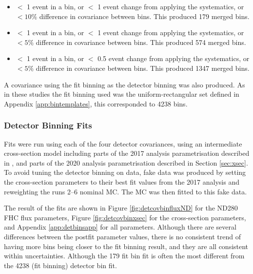 \begin{itemize}

\item $<$ 1 event in a bin, or $<$ 1 event change from applying the systematics, or $< 10\%$ difference in covariance between bins. This produced 179 merged bins.

\item $<$ 1 event in a bin, or $<$ 1 event change from applying the systematics, or $< 5\%$ difference in covariance between bins. This produced 574 merged bins.

\item $<$ 1 event in a bin, or $<$ 0.5 event change from applying the systematics, or $< 5\%$ difference in covariance between bins. This produced 1347 merged bins.

\end{itemize}

A covariance using the fit binning as the detector binning was also produced. As in these studies the fit binning used was the uniform-rectangular set defined in Appendix \ref{app:bintemplates}, this corresponded to 4238 bins.

\subsubsection{Detector Binning Fits}\label{sec:detbinfits}

Fits were run using each of the four detector covariances, using an intermediate cross-section model including parts of the 2017 analysis parametrisation described in \cite{tn315}, and parts of the 2020 analysis parametrisation described in Section \ref{sec:xsec}. To avoid tuning the detector binning on data, fake data was produced by setting the cross-section parameters to their best fit values from the 2017 analysis and reweighting the runs 2--6 nominal MC. The MC was then fitted to this fake data.

The result of the fits are shown in Figure \ref{fig:detcovbinfluxND} for the ND280 FHC flux parameters, Figure \ref{fig:detcovbinxsec} for the cross-section parameters, and Appendix \ref{app:detbinsapp} for all parameters. Although there are several differences between the postfit parameter values, there is no consistent trend of having more bins being closer to the fit binning result, and they are all consistent within uncertainties. Although the 179 fit bin fit is often the most different from the 4238 (fit binning) detector bin fit.

